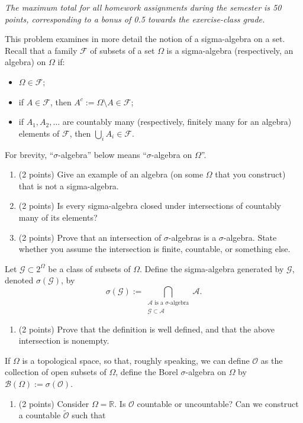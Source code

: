 \documentclass[11pt,a4paper]{article}
\begin{document}
\emph{The maximum total for all homework assignments during the semester is 50 points,
corresponding to a bonus of 0.5 towards the exercise-class grade.}
\begin{problem}
This problem examines in more detail the notion of a sigma-algebra on a set.
Recall that a family $\mathcal F$ of subsets of a set $\Omega$ is a sigma-algebra
(respectively, an algebra) on $\Omega$ if:
\begin{itemize}
\item $\Omega\in\mathcal F$;
\item if $A\in\mathcal F$, then $A^c:=\Omega\setminus A\in\mathcal F$;
\item if $A_1,A_2,\ldots$ are countably many (respectively, finitely many for an
algebra) elements of $\mathcal F$, then $\bigcup_i A_i\in\mathcal F$.
\end{itemize}
For brevity, ``$\sigma$-algebra'' below means ``$\sigma$-algebra on $\Omega$''.
\begin{enumerate}
\item (2 points) Give an example of an algebra (on some $\Omega$ that you construct)
that is not a sigma-algebra.
\item (2 points) Is every sigma-algebra closed under intersections of countably many of its elements?
\item (2 points) Prove that an intersection of $\sigma$-algebras is a $\sigma$-algebra.
State whether you assume the intersection is finite, countable, or something else.
\end{enumerate}
Let $\mathcal G\subset 2^\Omega$ be a class of subsets of $\Omega$. Define the
sigma-algebra generated by $\mathcal G$, denoted $\sigma(\mathcal G)$, by
\[\sigma(\mathcal G):=\bigcap_{\substack{\mathcal A\text{ is a }\sigma\text{-algebra}\\\mathcal G\subset\mathcal A}}\mathcal A.\]
\begin{enumerate}[start=4]
\item (2 points) Prove that the definition is well defined, and that the above intersection is nonempty.
\end{enumerate}
If $\Omega$ is a topological space, so that, roughly speaking, we can define
$\mathcal O$ as the collection of open subsets of $\Omega$, define the Borel
$\sigma$-algebra on $\Omega$ by $\mathcal B(\Omega):=\sigma(\mathcal O)$.
\begin{enumerate}[start=5]
\item (2 points) Consider $\Omega=\mathbb R$. Is $\mathcal O$ countable or
uncountable? Can we construct a countable $\widetilde{\mathcal O}$ such that

\end{enumerate}
\end{problem}
\end{document}
